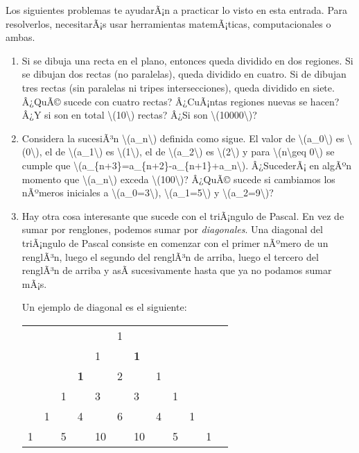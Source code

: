 \documentclass[
]{article}
\begin{document}
Los siguientes problemas te ayudarÃ¡n a practicar lo visto en esta
entrada. Para resolverlos, necesitarÃ¡s usar herramientas matemÃ¡ticas,
computacionales o ambas.

\begin{enumerate}
\item
  Si se dibuja una recta en el plano, entonces queda dividido en dos
  regiones. Si se dibujan dos rectas (no paralelas), queda dividido en
  cuatro. Si de dibujan tres rectas (sin paralelas ni tripes
  intersecciones), queda dividido en siete. Â¿QuÃ© sucede con cuatro
  rectas? Â¿CuÃ¡ntas regiones nuevas se hacen? Â¿Y si son en total
  {\textbackslash(10\textbackslash)} rectas? Â¿Si son
  {\textbackslash(10000\textbackslash)}?
\item
  Considera la sucesiÃ³n {\textbackslash(a\_n\textbackslash)} definida
  como sigue. El valor de {\textbackslash(a\_0\textbackslash)} es
  {\textbackslash(0\textbackslash)}, el de
  {\textbackslash(a\_1\textbackslash)} es
  {\textbackslash(1\textbackslash)}, el de
  {\textbackslash(a\_2\textbackslash)} es
  {\textbackslash(2\textbackslash)} y para
  {\textbackslash(n\textbackslash geq 0\textbackslash)} se cumple que
  {\textbackslash(a\_\{n+3\}=a\_\{n+2\}-a\_\{n+1\}+a\_n\textbackslash)}.
  Â¿SucederÃ¡ en algÃºn momento que {\textbackslash(a\_n\textbackslash)}
  exceda {\textbackslash(100\textbackslash)}? Â¿QuÃ© sucede si cambiamos
  los nÃºmeros iniciales a {\textbackslash(a\_0=3\textbackslash)},
  {\textbackslash(a\_1=5\textbackslash)} y
  {\textbackslash(a\_2=9\textbackslash)}?
\item
  Hay otra cosa interesante que sucede con el triÃ¡ngulo de Pascal. En
  vez de sumar por renglones, podemos sumar por \emph{diagonales}. Una
  diagonal del triÃ¡ngulo de Pascal consiste en comenzar con el primer
  nÃºmero de un renglÃ³n, luego el segundo del renglÃ³n de arriba, luego
  el tercero del renglÃ³n de arriba y asÃ­ sucesivamente hasta que ya no
  podamos sumar mÃ¡s.

  Un ejemplo de diagonal es el siguiente:

  \begin{longtable}[]{@{}llllllllllll@{}}
  \toprule\noalign{}
  & & & & & & & & & & & \\
  \midrule\noalign{}
  \endhead
  \bottomrule\noalign{}
  \endlastfoot
  & & & & & 1 & & & & & & \\
  & & & & 1 & & \textbf{1} & & & & & \\
  & & & \textbf{1} & & 2 & & 1 & & & & \\
  & & 1 & & 3 & & 3 & & 1 & & & \\
  & 1 & & 4 & & 6 & & 4 & & 1 & & \\
  1 & & 5 & & 10 & & 10 & & 5 & & 1 & \\
  \end{longtable}


\end{enumerate}
\end{document}
